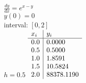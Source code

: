 {
$\displaystyle \frac{dy}{dx} = e^{x-y}$\\
$y(0)=0$\\
interval: $[0,2]$\\
$h = 0.5$
}
{
	$\begin{array}[b]{l | l}
		x_i & y_i    \\ \hline
		0.0 & 0.0000 \\
		0.5 & 0.5000 \\
		1.0 & 1.8591 \\
		1.5 & 10.5824 \\
		2.0 & 88378.1190 \\
	\end{array}$
}